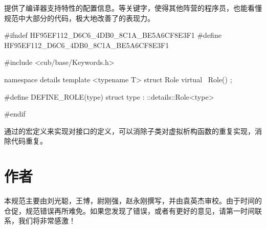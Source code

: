 \begin{content}
提供了编译器支持特性的配置信息。等关键字，使得其他阵营的程序员，也能看懂规范中大部分的代码，极大地改善了的表现力。

\begin{leftbar}
\begin{c++}[caption={\ttfamily{cub/base/Role.h}}]
#ifndef HF95EF112_D6C6_4DB0_8C1A_BE5A6CF8E3F1
#define HF95EF112_D6C6_4DB0_8C1A_BE5A6CF8E3F1

#include <cub/base/Keywords.h>

namespace details
{
   template <typename T>
   struct Role
   {
      virtual ~Role() {}
   };
}

#define DEFINE_ROLE(type) struct type : ::details::Role<type>

#endif
\end{c++}
\end{leftbar}

通过的宏定义来实现对接口的定义，可以消除子类对虚拟析构函数的重复实现，消除代码重复。

\end{content}

\section*{作者}

\begin{content}

本规范主要由刘光聪，王博，尉刚强，赵永刚撰写，并由袁英杰审校。由于时间的仓促，规范错误再所难免。如果您发现了错误，或者有更好的意见，请第一时间联系，我们将非常感激！

\end{content}
